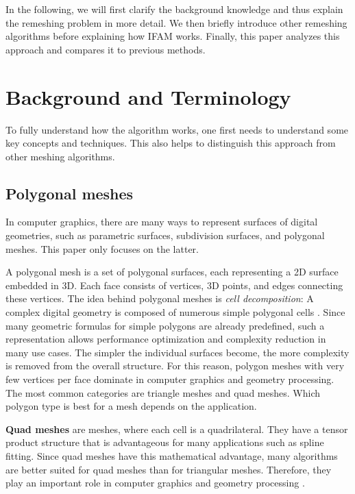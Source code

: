 \documentclass{ACGSeminar}
\begin{document}
In the following, we will first clarify the background knowledge and thus explain the remeshing problem in more detail. We then briefly introduce other remeshing algorithms before explaining how IFAM works. Finally, this paper analyzes this approach and compares it to previous methods.

\section{Background and Terminology}
To fully understand how the algorithm works, one first needs to understand some key concepts and techniques. This also helps to distinguish this approach from other meshing algorithms.

\subsection{Polygonal meshes}
In computer graphics, there are many ways to represent surfaces of digital geometries, such as parametric surfaces, subdivision surfaces, and polygonal meshes. This paper only focuses on the latter.\bigskip

A polygonal mesh is a set of polygonal surfaces, each representing a 2D surface embedded in 3D. Each face consists of vertices, 3D points, and edges connecting these vertices. The idea behind polygonal meshes is \textit{cell decomposition}: A complex digital geometry is composed of numerous simple polygonal cells \cite{bommes2013quad}. Since many geometric formulas for simple polygons are already predefined, such a representation allows performance optimization and complexity reduction in many use cases. The simpler the individual surfaces become, the more complexity is removed from the overall structure. For this reason, polygon meshes with very few vertices per face dominate in computer graphics and geometry processing. The most common categories are triangle meshes and quad meshes. Which polygon type is best for a mesh depends on the application.\bigskip

\textbf{Quad meshes} are meshes, where each cell is a quadrilateral. They have a tensor product structure that is advantageous for many applications such as spline fitting. Since quad meshes have this mathematical advantage, many algorithms are better suited for quad meshes than for triangular meshes. Therefore, they play an important role in computer graphics and geometry processing \cite{bommes2013quad, chen2019quadrilateral}.\bigskip
\end{document}
